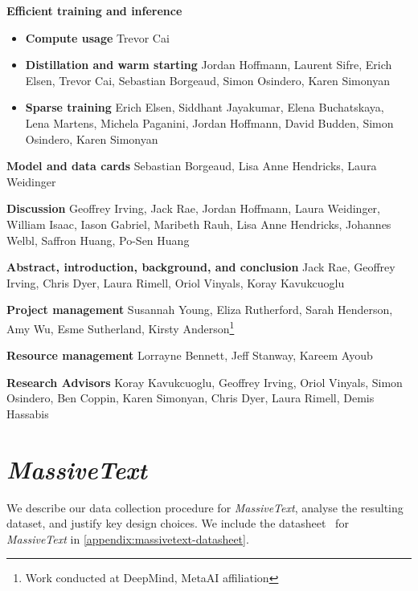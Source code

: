 \documentclass[11pt, a4paper, logo, internal, copyright, nonumbering]{deepmind}
\newcommand{\massivetext}{\textit{MassiveText}\xspace}
\begin{document}
\textbf{Efficient training and inference}
\begin{itemize}[label={},noitemsep,topsep=0pt]
\item \textbf{Compute usage}
Trevor Cai
\item \textbf{Distillation and warm starting}
Jordan Hoffmann, Laurent Sifre, Erich Elsen, Trevor Cai, Sebastian Borgeaud, Simon Osindero, Karen Simonyan
\item \textbf{Sparse training} 
Erich Elsen, Siddhant Jayakumar, Elena Buchatskaya, Lena Martens, Michela Paganini, Jordan Hoffmann, David Budden, Simon Osindero, Karen Simonyan
\end{itemize}

\noindent \textbf{Model and data cards}
Sebastian Borgeaud, Lisa Anne Hendricks, Laura Weidinger

\noindent \textbf{Discussion}
Geoffrey Irving, Jack Rae, Jordan Hoffmann, Laura Weidinger, William Isaac, Iason Gabriel, Maribeth Rauh, Lisa Anne Hendricks, Johannes Welbl, Saffron Huang, Po-Sen Huang

\noindent \textbf{Abstract, introduction, background, and conclusion}
Jack Rae, Geoffrey Irving, Chris Dyer, Laura Rimell, Oriol Vinyals, Koray Kavukcuoglu

\noindent \textbf{Project management}
Susannah Young, Eliza Rutherford, Sarah Henderson, Amy Wu, Esme Sutherland, Kirsty Anderson\footnote{Work conducted at DeepMind, MetaAI affiliation}

\noindent \textbf{Resource management}
Lorrayne Bennett, Jeff Stanway, Kareem Ayoub

\noindent \textbf{Research Advisors} Koray Kavukcuoglu, Geoffrey Irving, Oriol Vinyals, Simon Osindero, Ben Coppin, Karen Simonyan, Chris Dyer, Laura Rimell, Demis Hassabis




\newpage
\appendix
\setcounter{figure}{0}
\makeatletter 
\renewcommand{\thefigure}{A\@arabic\c@figure}
\makeatother

\setcounter{table}{0}
\makeatletter 
\renewcommand{\thetable}{A\@arabic\c@table}
\makeatother

\section{\massivetext}
\label{appendix:massive-text}
We describe our data collection procedure for \massivetext, analyse the resulting dataset, and justify key design choices. 
We include the datasheet~\citep{gebru2018datasheets} for \massivetext in \autoref{appendix:massivetext-datasheet}.
\end{document}

